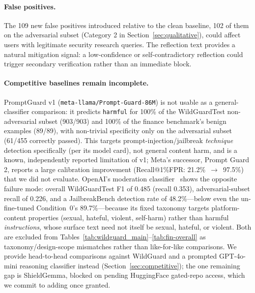 \documentclass[superintelligence,article,submit,pdftex,moreauthors]{Definitions/mdpi}
\begin{document}
\paragraph{False positives.}
The 109 new false positives introduced relative to the clean baseline, 102 of them on the adversarial subset (Category 2 in Section~\ref{sec:qualitative}), could affect users with legitimate security research queries. The reflection text provides a natural mitigation signal: a low-confidence or self-contradictory reflection could trigger secondary verification rather than an immediate block.

\paragraph{Competitive baselines remain incomplete.}
PromptGuard v1 (\texttt{meta-llama/Prompt-Guard-86M}) is not usable as a general-classifier comparison: it predicts \texttt{harmful} for 100\% of the WildGuardTest non-adversarial subset (903/903) and 100\% of the finance benchmark's benign examples (89/89), with non-trivial specificity only on the adversarial subset (61/455 correctly passed). This targets prompt-injection/jailbreak \emph{technique} detection specifically (per its model card), not general content harm, and is a known, independently reported limitation of v1; Meta's successor, Prompt Guard 2, reports a large calibration improvement (Recall@1\%FPR: 21.2\%~$\to$~97.5\%) that we did not evaluate. OpenAI's moderation classifier~\citep{markov2023holistic} shows the opposite failure mode: overall WildGuardTest F1 of 0.485 (recall 0.353), adversarial-subset recall of 0.226, and a JailbreakBench detection rate of 48.2\%---below even the un-fine-tuned Condition~0's 89.7\%---because its fixed taxonomy targets platform-content properties (sexual, hateful, violent, self-harm) rather than harmful \emph{instructions}, whose surface text need not itself be sexual, hateful, or violent. Both are excluded from Tables~\ref{tab:wildguard_main}--\ref{tab:fin-overall} as taxonomy/design-scope mismatches rather than like-for-like comparisons. We provide head-to-head comparisons against WildGuard and a prompted GPT-4o-mini reasoning classifier instead (Section~\ref{sec:competitive}); the one remaining gap is ShieldGemma, blocked on pending HuggingFace gated-repo access, which we commit to adding once granted.
\end{document}
